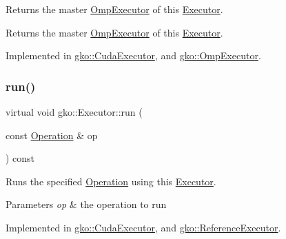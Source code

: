 Returns the master \hyperlink{classgko_1_1OmpExecutor}{Omp\+Executor} of this \hyperlink{classgko_1_1Executor}{Executor}. 

\begin{DoxyReturn}{Returns}
the master \hyperlink{classgko_1_1OmpExecutor}{Omp\+Executor} of this \hyperlink{classgko_1_1Executor}{Executor}. 
\end{DoxyReturn}


Implemented in \hyperlink{classgko_1_1CudaExecutor_a75295b3424224f907958abfa95c66298}{gko\+::\+Cuda\+Executor}, and \hyperlink{classgko_1_1OmpExecutor_ab297a7eba78463784d4d2ca08b03c675}{gko\+::\+Omp\+Executor}.

\mbox{\label{classgko_1_1Executor_a1de8e2668b76e66690acf5eef9e8324d}} 
\subsubsection{\texorpdfstring{run()}{run()}\hspace{0.1cm}{\footnotesize\ttfamily [1/2]}}
{\footnotesize\ttfamily virtual void gko\+::\+Executor\+::run (\begin{DoxyParamCaption}\item[{const \hyperlink{classgko_1_1Operation}{Operation} \&}]{op }\end{DoxyParamCaption}) const\hspace{0.3cm}{\ttfamily [pure virtual]}}



Runs the specified \hyperlink{classgko_1_1Operation}{Operation} using this \hyperlink{classgko_1_1Executor}{Executor}. 


\begin{DoxyParams}{Parameters}
{\em op} & the operation to run \\
\hline
\end{DoxyParams}


Implemented in \hyperlink{classgko_1_1CudaExecutor_a32a73a74403376d774933abf9663d59e}{gko\+::\+Cuda\+Executor}, and \hyperlink{classgko_1_1ReferenceExecutor_a82b41b42dbd26e8ac5b0146de79e5d34}{gko\+::\+Reference\+Executor}.

\mbox{\label{classgko_1_1Executor_a62cd3749291cf73a594a931a2b47ac53}} 
